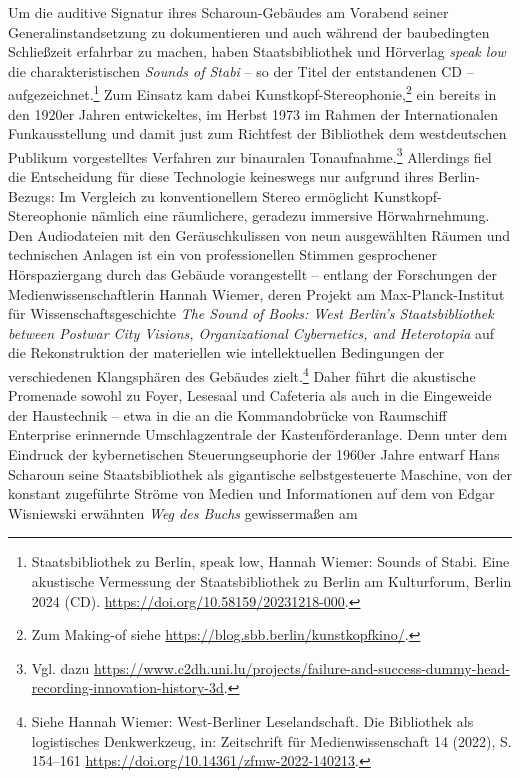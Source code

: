 \documentclass[a4paper,
fontsize=11pt,
oneside,
numbers=noperiodatend,
parskip=half-,
bibliography=totoc,
final
]{scrartcl}
\begin{document}
Um die auditive Signatur ihres Scharoun-Gebäudes am Vorabend seiner
Generalinstandsetzung zu dokumentieren und auch während der baubedingten
Schließzeit erfahrbar zu machen, haben Staatsbibliothek und Hörverlag
\emph{speak low} die charakteristischen \emph{Sounds of Stabi} -- so der
Titel der entstandenen CD -- aufgezeichnet.\footnote{Staatsbibliothek zu Berlin, speak low, Hannah Wiemer: Sounds of Stabi. Eine akustische Vermessung der Staatsbibliothek zu Berlin am Kulturforum, Berlin 2024 (CD). \url{https://doi.org/10.58159/20231218-000}.} Zum Einsatz kam dabei
Kunstkopf-Stereophonie,\footnote{Zum Making-of siehe
  \url{https://blog.sbb.berlin/kunstkopfkino/}.} ein bereits in den
1920er Jahren entwickeltes, im Herbst 1973 im Rahmen der Internationalen
Funkausstellung und damit just zum Richtfest der Bibliothek dem
westdeutschen Publikum vorgestelltes Verfahren zur binauralen
Tonaufnahme.\footnote{Vgl. dazu
  \url{https://www.c2dh.uni.lu/projects/failure-and-success-dummy-head-recording-innovation-history-3d}.}
Allerdings fiel die Entscheidung für diese Technologie keineswegs nur
aufgrund ihres Berlin-Bezugs: Im Vergleich zu konventionellem Stereo
ermöglicht Kunstkopf-Stereophonie nämlich eine räumlichere, geradezu
immersive Hörwahrnehmung. Den Audiodateien mit den Geräuschkulissen von
neun ausgewählten Räumen und technischen Anlagen ist ein von
professionellen Stimmen gesprochener Hörspaziergang durch das Gebäude
vorangestellt -- entlang der Forschungen der Medienwissenschaftlerin
Hannah Wiemer, deren Projekt am Max-Planck-Institut für
Wissenschaftsgeschichte \emph{The Sound of Books: West Berlin's
Staatsbibliothek between Postwar City Visions, Organizational
Cybernetics, and Heterotopia} auf die Rekonstruktion der materiellen wie
intellektuellen Bedingungen der verschiedenen Klangsphären des Gebäudes
zielt.\footnote{Siehe Hannah Wiemer: West-Berliner Leselandschaft. Die
  Bibliothek als logistisches Denkwerkzeug, in: Zeitschrift für
  Medienwissenschaft 14 (2022), S. 154--161
  \url{https://doi.org/10.14361/zfmw-2022-140213}.} Daher führt die
akustische Promenade sowohl zu Foyer, Lesesaal und Cafeteria als auch in
die Eingeweide der Haustechnik -- etwa in die an die Kommandobrücke von
Raumschiff Enterprise erinnernde Umschlagzentrale der
Kastenförderanlage. Denn unter dem Eindruck der kybernetischen
Steuerungseuphorie der 1960er Jahre entwarf Hans Scharoun seine
Staatsbibliothek als gigantische selbstgesteuerte Maschine, von der
konstant zugeführte Ströme von Medien und Informationen auf dem von
Edgar Wisniewski erwähnten \emph{Weg des Buchs} gewissermaßen am
\end{document}
